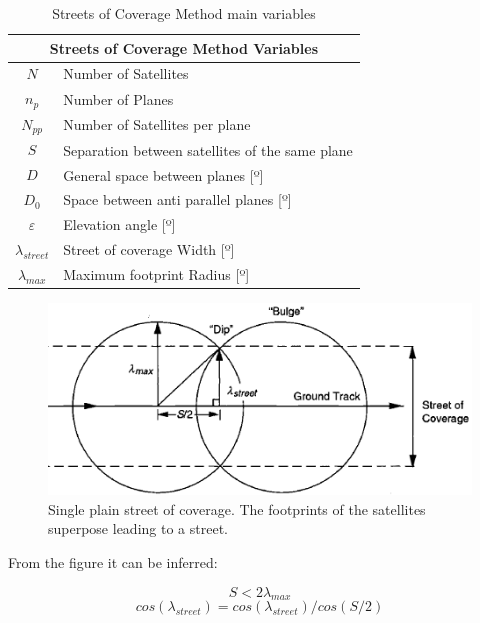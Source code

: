 \begin{table}[H]
\centering
\begin{tabular}{|c|l|}
\hline
\multicolumn{2}{|c|}{Streets of Coverage Method Variables}     \\ \hline
$$N$$              & Number of Satellites                      \\ \hline
$n_{p}$            & Number of Planes                          \\ \hline
$N_{pp}$           & Number of Satellites per plane            \\ \hline
$$S$$              & Separation between satellites of the same plane \\ \hline
$$D$$              & General space between planes {[}º{]}      \\ \hline
$D_{0}$            & Space between anti parallel planes {[}º{]} \\ \hline
$\varepsilon$      & Elevation angle {[}º{]}                   \\ \hline
$\lambda_{street}$ & Street of coverage Width {[}º{]}          \\ \hline
$\lambda_{max}$    & Maximum footprint Radius {[}º{]}          \\ \hline
\end{tabular}
\caption{Streets of Coverage Method main variables}
\end{table}  

\begin{figure}[H]
\begin{center}
\includegraphics[scale=0.7]{PolarOrbits/planestreet.png}
\caption[Single plain street of coverage]{Single plain street of coverage. The footprints of the satellites superpose leading to a street.\cite{ccar}}
\end{center}
\end{figure}

From the figure it can be inferred:

$$S < 2\lambda_{max}$$
$$cos(\lambda_{street}) = cos(\lambda_{street})/cos(S/2)$$

